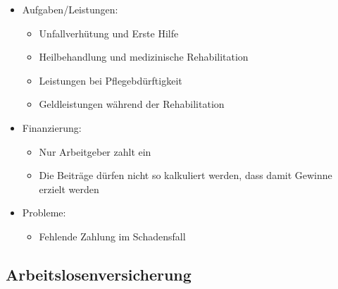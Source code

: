 \documentclass[a4paper, 12pt]{report}
\begin{document}
\begin{itemize}
\begin{itemize}
        \end{itemize}
    \item Aufgaben/Leistungen: 
        \begin{itemize}
            \item Unfallverhütung und Erste Hilfe
            \item Heilbehandlung und medizinische Rehabilitation
            \item Leistungen bei Pflegebdürftigkeit
            \item Geldleistungen während der Rehabilitation
        \end{itemize}
    \item Finanzierung:
        \begin{itemize}
            \item Nur Arbeitgeber zahlt ein
            \item Die Beiträge dürfen nicht so kalkuliert werden, dass damit 
                Gewinne erzielt werden
        \end{itemize}
    \item Probleme: 
        \begin{itemize}
            \item Fehlende Zahlung im Schadensfall
        \end{itemize}
\end{itemize}

\newpage
\subsection{Arbeitslosenversicherung}
\end{document}
